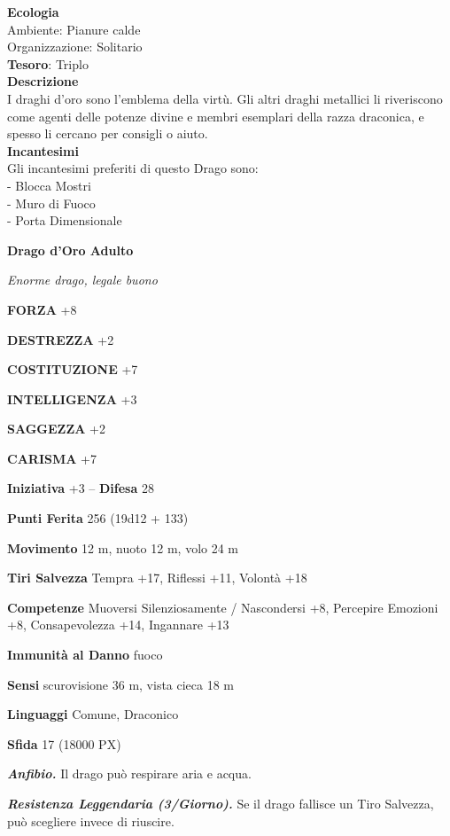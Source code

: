 \begin{multicols}{2}
	\textbf{Ecologia}\\
	Ambiente: Pianure calde\\
	Organizzazione: Solitario\\
	\textbf{Tesoro}: Triplo\\
	\textbf{Descrizione}\\
	I draghi d'oro sono l'emblema della virtù. Gli altri draghi metallici li riveriscono come agenti delle potenze divine e membri esemplari della razza draconica, e spesso li cercano per consigli o aiuto.\\
	\textbf{Incantesimi}\\
	Gli incantesimi preferiti di questo Drago sono:\\
	- Blocca Mostri\\
	- Muro di Fuoco\\
	- Porta Dimensionale

	\medskip{}\textbf{Drago d'Oro Adulto}

	\textit{Enorme drago, legale buono}

	\textbf{FORZA} +8

	\textbf{DESTREZZA} +2

	\textbf{COSTITUZIONE} +7

	\textbf{INTELLIGENZA} +3

	\textbf{SAGGEZZA} +2

	\textbf{CARISMA} +7

	\textbf{Iniziativa} +3 -- \textbf{Difesa} 28

	\textbf{Punti Ferita} 256 (19d12 + 133)

	\textbf{Movimento} 12 m, nuoto 12 m, volo 24 m

	\textbf{Tiri Salvezza} Tempra +17, Riflessi +11, Volontà +18

	\textbf{Competenze} Muoversi Silenziosamente / Nascondersi +8, Percepire Emozioni +8, Consapevolezza +14, Ingannare +13

	\textbf{Immunità al Danno} fuoco

	\textbf{Sensi} scurovisione 36 m, vista cieca 18 m

	\textbf{Linguaggi} Comune, Draconico

	\textbf{Sfida} 17 (18000 PX)

	\textit{\textbf{Anfibio.}} Il drago può respirare aria e acqua.

	\textit{\textbf{Resistenza Leggendaria (3/Giorno).}} Se il drago fallisce un Tiro Salvezza, può scegliere invece di riuscire.


\end{multicols}
